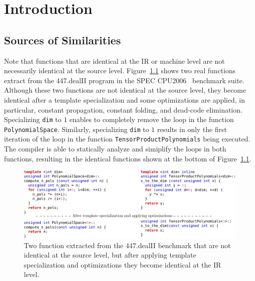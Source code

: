 
\chapter{Introduction}

\section{Sources of Similarities}

Note that functions that are identical at the IR or machine level are not
necessarily identical at the source level.
Figure~\ref{fig:identical-example} shows two real functions extract from the
447.dealII program in the SPEC CPU2006~\cite{spec} benchmark suite.
Although these two functions are not identical at the source level, they become
identical after a template specialization and some optimizations are applied, in
particular, constant propagation, constant folding, and dead-code elimination. 
Specializing \verb|dim| to $1$ enables to completely remove the loop in the
function \verb|PolynomialSpace|.
Similarly, specializing \verb|dim| to $1$ results in only the first iteration
of the loop in the function \verb|TensorProductPolynomials| being executed.
The compiler is able to statically analyze and simiplify the loops in both
functions, resulting in the identical functions shown at the bottom of
Figure~\ref{fig:identical-example}.

\begin{figure}[h]
\centering
\includegraphics[width=\textwidth]{src/intro/figs/identical-example}
\caption{Two function extracted from the 447.dealII benchmark that are not
           identical at the source level, but after applying template
           specialization and optimizations they become identical at the IR
           level.}
\label{fig:identical-example}
\end{figure}

